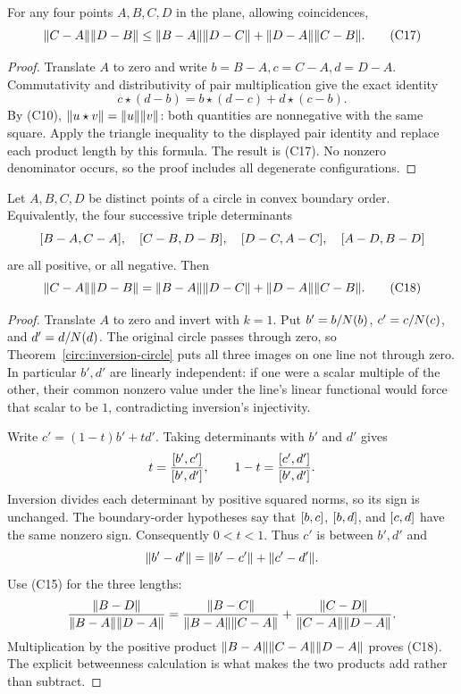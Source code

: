 \begin{theorem}
\label{circ:ptolemy-inequality}
For any four points $A,B,C,D$ in the plane, allowing coincidences,
\[
 \lVert C-A\rVert\lVert D-B\rVert
 \le\lVert B-A\rVert\lVert D-C\rVert+\lVert D-A\rVert\lVert C-B\rVert.          \tag{C17}
\]
\end{theorem}
\begin{proof}
Translate $A$ to zero and write $b=B-A,c=C-A,d=D-A$.
Commutativity and distributivity of pair multiplication give the exact
identity
\[
 c\star(d-b)=b\star(d-c)+d\star(c-b).
\]
By (C10), $\lVert u\star v\rVert=\lVert u\rVert\lVert v\rVert$: both quantities are
nonnegative with the same square.  Apply the triangle inequality to the
displayed pair identity and replace each product length by this formula.
The result is (C17).  No nonzero denominator occurs, so the proof includes
all degenerate configurations.
\end{proof}

\begin{theorem}
\label{circ:ptolemy}
Let $A,B,C,D$ be distinct points of a circle in convex boundary order.
Equivalently, the four successive triple determinants
\[
 [B-A,C-A],\quad[C-B,D-B],\quad
 [D-C,A-C],\quad[A-D,B-D]
\]
are all positive, or all negative.  Then
\[
 \lVert C-A\rVert\lVert D-B\rVert
 =\lVert B-A\rVert\lVert D-C\rVert+\lVert D-A\rVert\lVert C-B\rVert.           \tag{C18}
\]
\end{theorem}
\begin{proof}
Translate $A$ to zero and invert with $k=1$.  Put
$b'=b/N(b)$, $c'=c/N(c)$, and $d'=d/N(d)$.
The original circle passes through zero, so
Theorem~\ref{circ:inversion-circle} puts all three images on one line
not through zero.  In particular $b',d'$ are linearly independent:
if one were a scalar multiple of the other, their common nonzero value
under the line's linear functional would force that scalar to be $1$,
contradicting inversion's injectivity.

Write $c'=(1-t)b'+td'$.  Taking determinants with $b'$ and $d'$ gives
\[
 t=\frac{[b',c']}{[b',d']},\qquad
 1-t=\frac{[c',d']}{[b',d']}.
\]
Inversion divides each determinant by positive squared norms, so its
sign is unchanged.  The boundary-order hypotheses say that
$[b,c]$, $[b,d]$, and $[c,d]$ have the same nonzero sign.
Consequently $0<t<1$.  Thus $c'$ is between $b',d'$ and
\[
 \lVert b'-d'\rVert=\lVert b'-c'\rVert+\lVert c'-d'\rVert.
\]
Use (C15) for the three lengths:
\[
 \frac{\lVert B-D\rVert}{\lVert B-A\rVert\lVert D-A\rVert}
 =\frac{\lVert B-C\rVert}{\lVert B-A\rVert\lVert C-A\rVert}
  +\frac{\lVert C-D\rVert}{\lVert C-A\rVert\lVert D-A\rVert}.
\]
Multiplication by the positive product
$\lVert B-A\rVert\lVert C-A\rVert\lVert D-A\rVert$ proves (C18).
The explicit betweenness calculation is what makes the two products add
rather than subtract.
\end{proof}

